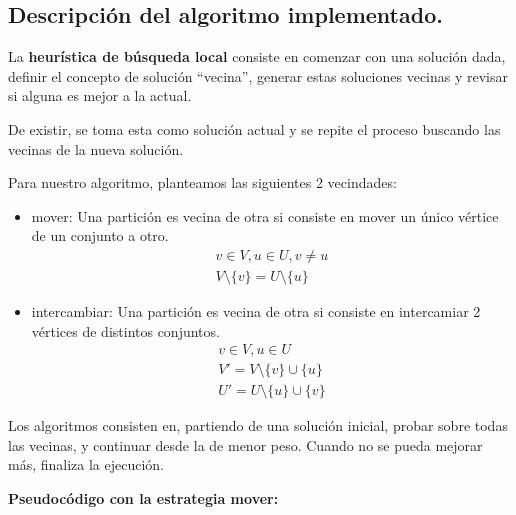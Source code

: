\subsection{Descripción del algoritmo implementado.}
\vspace*{0.3cm}

La \textbf{heurística de búsqueda local} consiste en comenzar con una
solución dada, definir el concepto de solución ``vecina'', generar estas
soluciones vecinas y revisar si alguna es mejor a la actual.

De existir, se toma esta como solución actual y se repite el proceso
buscando las vecinas de la nueva solución.

\vspace*{0.3cm}

Para nuestro algoritmo, planteamos las siguientes 2 vecindades:

\begin{itemize}
    \item mover: Una partición es vecina de otra si consiste en mover un único vértice de un conjunto a otro.
    \begin{align*}
        v \in V, u \in U, v \ne u \\
        V \setminus \{v\} = U \setminus \{u\}
    \end{align*}

    \item intercambiar: Una partición es vecina de otra si consiste en intercamiar 2 vértices de distintos conjuntos.
    \begin{align*}
        v \in V, u \in U \\
        V' = V \setminus \{v\} \cup \{u\} \\
        U' = U \setminus \{u\} \cup \{v\}
    \end{align*}
\end{itemize}

Los algoritmos consisten en, partiendo de una solución inicial, probar sobre todas las vecinas, y continuar desde la de menor peso. Cuando no se pueda mejorar más, finaliza la ejecución.

\vspace*{0.5cm}

\textbf{Pseudocódigo con la estrategia mover:}

\vspace*{0.3cm}

